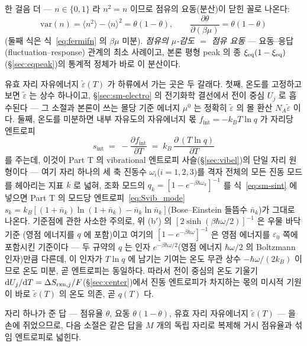 한 걸음 더 --- $n\in\{0,1\}$ 라 $n^2=n$ 이므로 점유의 요동(분산)이 닫힌 꼴로 나온다:
\begin{equation}
\mathrm{var}(n)=\langle n^2\rangle-\langle n\rangle^2=\theta(1-\theta),
\qquad
\frac{\partial\theta}{\partial(\beta\mu)}=\theta(1-\theta)
\label{eq:sm-flucres}
\end{equation}
(둘째 식은 식~\eqref{eq:fermifn} 의 $\beta\mu$ 미분). \emph{점유의 $\mu$-감도 $=$ 점유 요동} --- 요동--응답
(fluctuation--response) 관계의 최소 사례이고, 본론 평형 peak 의 종 $\xi_{\mathrm{eq}}(1-\xi_{\mathrm{eq}})$(\S\ref{sec:eqpeak})의
통계적 정체가 바로 이 분산이다.

유효 자리 자유에너지 $\tilde\varepsilon(T)$ 가 하류에서 가는 곳은 두 갈래다. 첫째, 온도를 고정하고 보면
$\tilde\varepsilon$ 는 상수 하나이고, \S\ref{sec:sm-electro} 의 전기화학 결선에서 전이 중심 $U_j$ 로
흡수된다 --- 그 소절과 본론이 쓰는 몰당 기준 에너지 $\mu^0$ 는 정확히 $\tilde\varepsilon$ 의 몰 환산
$N_A\tilde\varepsilon$ 이다. 둘째, 온도를 미분하면 내부 자유도의 자유에너지 몫
$f_\mathrm{int}=-k_BT\ln q$ 가 자리당 엔트로피
\begin{equation}
s_\mathrm{int}\;=\;-\frac{\partial f_\mathrm{int}}{\partial T}
\;=\;k_B\,\frac{\partial\,(T\ln q)}{\partial T}
\label{eq:sm-sint}
\end{equation}
를 주는데, 이것이 Part T 의 vibrational 엔트로피 사슬(\S\ref{sec:vibel})의 단일 자리 원형이다 --- 여기 자리 하나의
세 축 진동수 $\omega_i$($i=1,2,3$)를 격자 전체의 모든 진동 모드를 헤아리는 지표 $k$ 로 넓혀, 조화 모드의
$q_k=[1-e^{-\beta\hbar\omega_k}]^{-1}$ 를 식~\eqref{eq:sm-sint} 에 넣으면 Part T 의 모드당 엔트로피~\eqref{eq:Svib_mode}
$s_k=k_B[(1+\bar n_k)\ln(1+\bar n_k)-\bar n_k\ln\bar n_k]$(Bose--Einstein 들뜸수 $\bar n_k$)가 그대로
나온다. 기준점에 관한 사소한 주의로, 위 (b$'$) 의 $[2\sinh(\beta\hbar\omega/2)]^{-1}$ 은 우물 바닥 기준
(영점 에너지를 $q$ 에 포함)이고 여기의 $[1-e^{-\beta\hbar\omega}]^{-1}$ 은 영점 에너지를
$\varepsilon_0$ 쪽에 포함시킨 기준이다 --- 두 규약의 $q$ 는 인자 $e^{-\beta\hbar\omega/2}$(영점 에너지
$\hbar\omega/2$ 의 Boltzmann 인자)만큼 다른데, 이 인자가 $T\ln q$ 에 남기는 기여는 온도 무관 상수
$-\hbar\omega/(2k_B)$ 이므로 온도 미분, 곧 엔트로피는 동일하다. 따라서 전이 중심의 온도 기울기
$\mathrm{d} U_j/\mathrm{d} T=\Delta S_{\mathrm{rxn},j}/F$(\S\ref{sec:center})에서 진동
엔트로피가 차지하는 몫의 미시적 기원이 바로 $\tilde\varepsilon(T)$ 의 온도 의존, 곧 $q(T)$ 다.

자리 하나가 준 답 --- 점유율 $\theta$, 요동 $\theta(1-\theta)$, 유효 자리 자유에너지
$\tilde\varepsilon(T)$ --- 을 손에 쥐었으므로, 다음 소절은 같은 답을 $M$ 개의 독립 자리로 복제해 거시
점유율과 섞임 엔트로피로 넓힌다.

